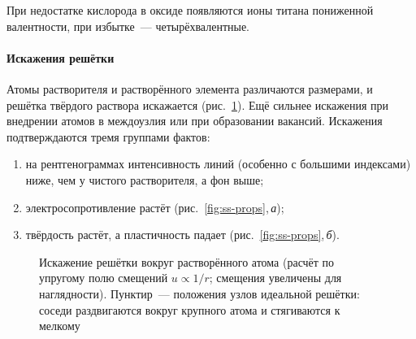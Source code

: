 При недостатке кислорода в оксиде появляются ионы титана пониженной
валентности, при избытке~— четырёхвалентные.

\paragraph{Искажения решётки}
Атомы растворителя и растворённого элемента различаются размерами, и
решётка твёрдого раствора искажается (рис.~\ref{fig:ss-distort}). Ещё
сильнее искажения при внедрении атомов в междоузлия или при образовании
вакансий. Искажения подтверждаются тремя группами фактов:
\begin{enumerate}
\item на рентгенограммах интенсивность линий (особенно с большими
индексами) ниже, чем у чистого растворителя, а фон выше;
\item электросопротивление растёт (рис.~\ref{fig:ss-props},\,\textit{а});
\item твёрдость растёт, а пластичность падает (рис.~\ref{fig:ss-props},\,\textit{б}).
\end{enumerate}

\begin{figure}[ht]
\centering
{}
\caption{Искажение решётки вокруг растворённого атома (расчёт по
упругому полю смещений $u\propto1/r$; смещения увеличены для
наглядности). Пунктир~— положения узлов идеальной решётки:
соседи раздвигаются вокруг крупного атома и стягиваются к мелкому}
\label{fig:ss-distort}
\end{figure}

